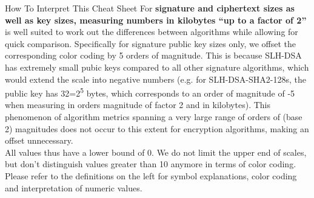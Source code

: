 \documentclass[11pt,english,a4paper, landscape]{scrartcl}
\begin{document}
\begin{minipage}[t]{0.58\textwidth}
\begin{algorithmbox}{How To Interpret This Cheat Sheet}
			For {\bfseries signature and ciphertext sizes as well as key sizes, measuring numbers in kilobytes ``up to a factor of 2''} is well suited to work out the differences between algorithms while allowing for quick comparison. Specifically for signature public key sizes only, we offset the corresponding color coding by 5 orders of magnitude. This is because SLH-DSA has extremely small pubic keys compared to all other signature algorithms, which would extend the scale into negative numbers (e.g. for SLH-DSA-SHA2-128s, the public key has 32=2\textsuperscript{5} bytes, which corresponds to an order of magnitude of -5 when measuring in orders magnitude of factor 2 and in kilobytes). This phenomenon of algorithm metrics spanning a very large range of orders of (base 2) magnitudes does not occur to this extent for encryption algorithms, making an offset unnecessary.\\[\baselineskip]

			All values thus have a lower bound of 0. We do not limit the upper end of scales, but don't distinguish values greater than 10 anymore in terms of color coding. Please refer to the definitions on the left for symbol explanations, color coding and interpretation of numeric values.
			\vspace{0.7cm}
		\end{algorithmbox}
	\end{minipage}


\end{document}
